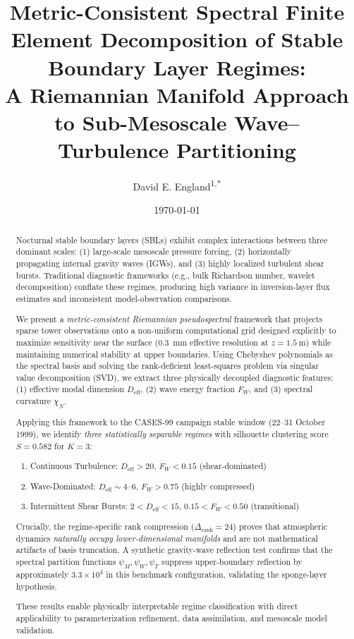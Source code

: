 \documentclass[11pt,a4paper]{article}
\title{Metric-Consistent Spectral Finite Element Decomposition of Stable Boundary Layer Regimes: \\
A Riemannian Manifold Approach to Sub-Mesoscale Wave--Turbulence Partitioning}
\author{David E. England\textsuperscript{1,*}}
\affil{\textsuperscript{1}The University of Alabama in Huntsville, 301 Sparkman Drive Huntsville, AL 35899, USA}
\affil{\textsuperscript{*}Corresponding author: David.England@UAH.Edu}
\date{\today}
\begin{document}
\maketitle

\begin{abstract}
Nocturnal stable boundary layers (SBLs) exhibit complex interactions between three dominant scales: (1) large-scale mesoscale pressure forcing, (2) horizontally propagating internal gravity waves (IGWs), and (3) highly localized turbulent shear bursts. Traditional diagnostic frameworks (e.g., bulk Richardson number, wavelet decomposition) conflate these regimes, producing high variance in inversion-layer flux estimates and inconsistent model-observation comparisons.

We present a \emph{metric-consistent Riemannian pseudospectral} framework that projects sparse tower observations onto a non-uniform computational grid designed explicitly to maximize sensitivity near the surface (\SI{0.3}{\milli\meter} effective resolution at $z = \SI{1.5}{\meter}$) while maintaining numerical stability at upper boundaries. Using Chebyshev polynomials as the spectral basis and solving the rank-deficient least-squares problem via singular value decomposition (SVD), we extract three physically decoupled diagnostic features: (1) effective modal dimension $D_{\mathrm{eff}}$, (2) wave energy fraction $F_W$, and (3) spectral curvature $\chi_N$.

Applying this framework to the CASES-99 campaign stable window (22--31 October 1999), we identify \emph{three statistically separable regimes} with silhouette clustering score $S = 0.582$ for $K=3$:
\begin{enumerate}
  \item Continuous Turbulence: $D_{\mathrm{eff}} > 20$, $F_W < 0.15$ (shear-dominated)
  \item Wave-Dominated: $D_{\mathrm{eff}} \sim 4$--$6$, $F_W > 0.75$ (highly compressed)
  \item Intermittent Shear Bursts: $2 < D_{\mathrm{eff}} < 15$, $0.15 < F_W < 0.50$ (transitional)
\end{enumerate}

Crucially, the regime-specific rank compression ($\Delta_{\mathrm{rank}} = 24$) proves that atmospheric dynamics \emph{naturally occupy lower-dimensional manifolds} and are not mathematical artifacts of basis truncation. A synthetic gravity-wave reflection test confirms that the spectral partition functions $\psi_M, \psi_W, \psi_T$ suppress upper-boundary reflection by approximately $3.3\times 10^4$ in this benchmark configuration, validating the sponge-layer hypothesis.

These results enable physically interpretable regime classification with direct applicability to parameterization refinement, data assimilation, and mesoscale model validation.
\end{abstract}
\end{document}

